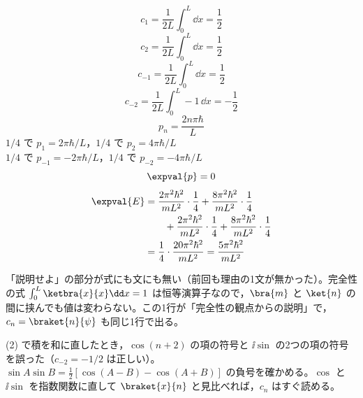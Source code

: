 \[ c_{1}=\frac{1}{2L}\int_{0}^{L}\dd x=\frac{1}{2} \]
\[ c_{2}=\frac{1}{2L}\int_{0}^{L}\dd x=\frac{1}{2} \]
\[ c_{-1}=\frac{1}{2L}\int_{0}^{L}\dd x=\frac{1}{2} \]
\[ c_{-2}=\frac{1}{2L}\int_{0}^{L}-1\,\dd x=-\frac{1}{2} \]
\[ p_{n}=\frac{2n\pi\hbar}{L} \]
$1/4$ で $p_{1}=2\pi\hbar/L$，$1/4$ で $p_{2}=4\pi\hbar/L$\\
$1/4$ で $p_{-1}=-2\pi\hbar/L$，$1/4$ で $p_{-2}=-4\pi\hbar/L$
\[ \expval{p}=0 \]
\begin{align*}
\expval{E}&=\frac{2\pi^{2}\hbar^{2}}{mL^{2}}\cdot\frac{1}{4}+\frac{8\pi^{2}\hbar^{2}}{mL^{2}}\cdot\frac{1}{4}\\
&\qquad+\frac{2\pi^{2}\hbar^{2}}{mL^{2}}\cdot\frac{1}{4}+\frac{8\pi^{2}\hbar^{2}}{mL^{2}}\cdot\frac{1}{4}\\
&=\frac{1}{4}\cdot\frac{20\pi^{2}\hbar^{2}}{mL^{2}}=\frac{5\pi^{2}\hbar^{2}}{mL^{2}}
\end{align*}
\item {} 「説明せよ」の部分が式にも文にも無い（前回も理由の1文が無かった）。完全性の式 $\int_{0}^{L}\ketbra{x}{x}\dd x=1$ は恒等演算子なので，$\bra{m}$ と $\ket{n}$ の間に挟んでも値は変わらない。この1行が「完全性の観点からの説明」で，$c_{n}=\braket{n}{\psi}$ も同じ1行で出る。
\item (2) で積を和に直したとき，$\cos(n+2)$ の項の符号と $\ii\sin$ の2つの項の符号を誤った（$c_{-2}=-1/2$ は正しい）。$\sin A\sin B=\frac{1}{2}[\cos(A-B)-\cos(A+B)]$ の負号を確かめる。$\cos$ と $\ii\sin$ を指数関数に直して $\braket{x}{n}$ と見比べれば，$c_{n}$ はすぐ読める。
